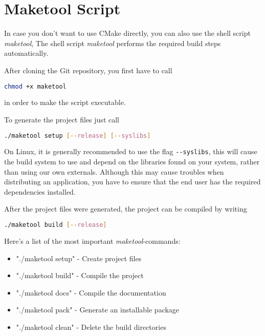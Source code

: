 \section{Maketool Script}
\label{Chapter:Linux_Maketool}
In case you don't want to use CMake directly, you can also use the shell script \emph{maketool}, The shell script \emph{maketool} performs the required build steps automatically.

After cloning the Git repository, you first have to call
\begin{lstlisting}[language=sh]
chmod +x maketool
\end{lstlisting}
in order to make the script executable.

To generate the project files just call
\begin{lstlisting}[language=sh]
./maketool setup [--release] [--syslibs]
\end{lstlisting}

On Linux, it is generally recommended to use the flag \verb+--syslibs+, this will cause the build system to use and depend on the libraries found on your system, rather than using our own externals. Although this may cause troubles when distributing an application, you have to ensure that the end user has the required dependencies installed.

After the project files were generated, the project can be compiled by writing
\begin{lstlisting}[language=sh]
./maketool build [--release]
\end{lstlisting}

Here's a list of the most important \emph{maketool}-commands:
\begin{itemize}
\item{"./maketool setup"	- Create project files}
\item{"./maketool build"	- Compile the project}
\item{"./maketool docs"		- Compile the documentation}
\item{"./maketool pack"		- Generate an installable package}
\item{"./maketool clean"	- Delete the build directories}
\end{itemize}

